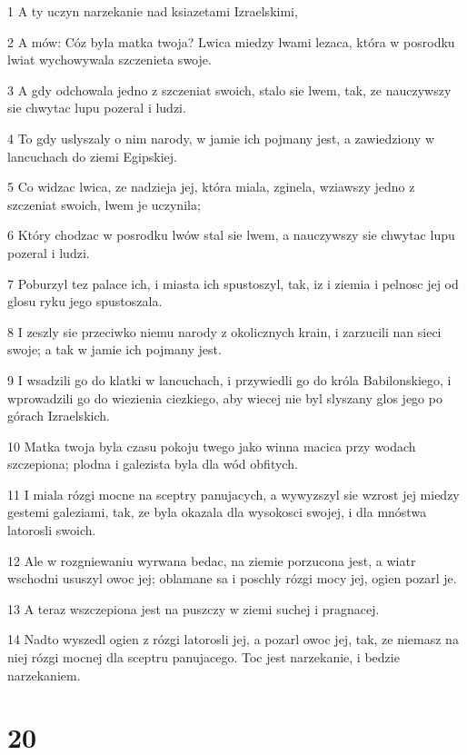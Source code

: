 \par 1 A ty uczyn narzekanie nad ksiazetami Izraelskimi,
\par 2 A mów: Cóz byla matka twoja? Lwica miedzy lwami lezaca, która w posrodku lwiat wychowywala szczenieta swoje.
\par 3 A gdy odchowala jedno z szczeniat swoich, stalo sie lwem, tak, ze nauczywszy sie chwytac lupu pozeral i ludzi.
\par 4 To gdy uslyszaly o nim narody, w jamie ich pojmany jest, a zawiedziony w lancuchach do ziemi Egipskiej.
\par 5 Co widzac lwica, ze nadzieja jej, która miala, zginela, wziawszy jedno z szczeniat swoich, lwem je uczynila;
\par 6 Który chodzac w posrodku lwów stal sie lwem, a nauczywszy sie chwytac lupu pozeral i ludzi.
\par 7 Poburzyl tez palace ich, i miasta ich spustoszyl, tak, iz i ziemia i pelnosc jej od glosu ryku jego spustoszala.
\par 8 I zeszly sie przeciwko niemu narody z okolicznych krain, i zarzucili nan sieci swoje; a tak w jamie ich pojmany jest.
\par 9 I wsadzili go do klatki w lancuchach, i przywiedli go do króla Babilonskiego, i wprowadzili go do wiezienia ciezkiego, aby wiecej nie byl slyszany glos jego po górach Izraelskich.
\par 10 Matka twoja byla czasu pokoju twego jako winna macica przy wodach szczepiona; plodna i galezista byla dla wód obfitych.
\par 11 I miala rózgi mocne na sceptry panujacych, a wywyzszyl sie wzrost jej miedzy gestemi galeziami, tak, ze byla okazala dla wysokosci swojej, i dla mnóstwa latorosli swoich.
\par 12 Ale w rozgniewaniu wyrwana bedac, na ziemie porzucona jest, a wiatr wschodni ususzyl owoc jej; oblamane sa i poschly rózgi mocy jej, ogien pozarl je.
\par 13 A teraz wszczepiona jest na puszczy w ziemi suchej i pragnacej.
\par 14 Nadto wyszedl ogien z rózgi latorosli jej, a pozarl owoc jej, tak, ze niemasz na niej rózgi mocnej dla sceptru panujacego. Toc jest narzekanie, i bedzie narzekaniem.

\chapter{20}

